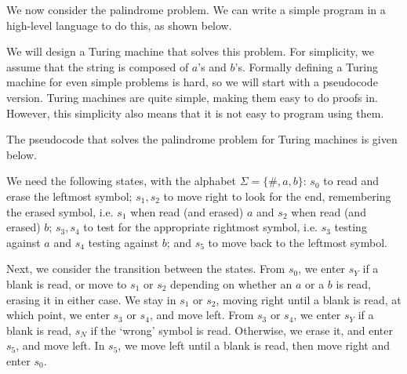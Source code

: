 \documentclass[a4paper, openany]{memoir}
\begin{document}
We now consider the palindrome problem. We can write a simple program in a high-level language to do this, as shown below.

We will design a Turing machine that solves this problem. For simplicity, we assume that the string is composed of $a$'s and $b$'s. Formally defining a Turing machine for even simple problems is hard, so we will start with a pseudocode version. Turing machines are quite simple, making them easy to do proofs in. However, this simplicity also means that it is not easy to program using them. 

\newpage
The pseudocode that solves the palindrome problem for Turing machines is given below.


We need the following states, with the alphabet $\Sigma = \{\#, a, b\}$: $s_0$ to read and erase the leftmost symbol; $s_1, s_2$ to move right to look for the end, remembering the erased symbol, i.e. $s_1$ when read (and erased) $a$ and $s_2$ when read (and erased) $b$; $s_3, s_4$ to test for the appropriate rightmost symbol, i.e. $s_3$ testing against $a$ and $s_4$ testing against $b$; and $s_5$ to move back to the leftmost symbol.

Next, we consider the transition between the states. From $s_0$, we enter $s_Y$ if a blank is read, or move to $s_1$ or $s_2$ depending on whether an $a$ or a $b$ is read, erasing it in either case. We stay in $s_1$ or $s_2$, moving right until a blank is read, at which point, we enter $s_3$ or $s_4$, and move left. From $s_3$ or $s_4$, we enter $s_Y$ if a blank is read, $s_N$ if the `wrong' symbol is read. Otherwise, we erase it, and enter $s_5$, and move left. In $s_5$, we move left until a blank is read, then move right and enter $s_0$.
\end{document}
